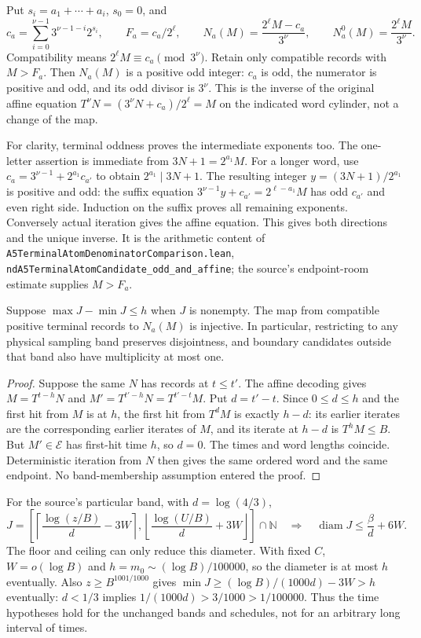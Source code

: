 Put $s_i=a_1+\cdots+a_i$, $s_0=0$, and
\[
 c_a=\sum_{i=0}^{\nu-1}3^{\nu-1-i}2^{s_i},\qquad
 F_a=c_a/2^\ell,\qquad
 N_a(M)=\frac{2^\ell M-c_a}{3^\nu},\qquad
 N_a^0(M)=\frac{2^\ell M}{3^\nu}.
\]
Compatibility means $2^\ell M\equiv c_a\pmod{3^\nu}$.
Retain only compatible records with $M>F_a$. Then $N_a(M)$ is a
positive odd integer: $c_a$ is odd, the numerator is positive and
odd, and its odd divisor is $3^\nu$.
This is the inverse of the original affine equation
$T^\nu N=(3^\nu N+c_a)/2^\ell=M$ on the indicated word cylinder,
not a change of the map.

For clarity, terminal oddness proves the intermediate exponents too.
The one-letter assertion is immediate from $3N+1=2^{a_1}M$.
For a longer word, use $c_a=3^{\nu-1}+2^{a_1}c_{a'}$ to obtain
$2^{a_1}\mid3N+1$. The resulting integer $y=(3N+1)/2^{a_1}$
is positive and odd: the suffix equation
$3^{\nu-1}y+c_{a'}=2^{\ell-a_1}M$ has odd $c_{a'}$ and even
right side. Induction on the suffix proves all remaining exponents.
Conversely actual iteration gives the affine equation.
This gives both directions and the unique inverse.
It is the arithmetic content of
\texttt{A5TerminalAtomDenominatorComparison.lean},
\texttt{ndA5TerminalAtomCandidate\_odd\_and\_affine};
the source's endpoint-room estimate supplies $M>F_a$.

\begin{proposition}
\label{prop:Mazur-atoms}
Suppose $\max J-\min J\le h$ when $J$ is nonempty.
The map from compatible positive terminal records to $N_a(M)$ is
injective. In particular, restricting to any physical sampling band
preserves disjointness, and boundary candidates outside that band
also have multiplicity at most one.
\end{proposition}
\begin{proof}
Suppose the same $N$ has records at $t\le t'$.
The affine decoding gives $M=T^{t-h}N$ and
$M'=T^{t'-h}N=T^{t'-t}M$. Put $d=t'-t$.
Since $0\le d\le h$ and the first hit from $M$ is at $h$,
the first hit from $T^dM$ is exactly $h-d$:
its earlier iterates are the corresponding earlier iterates of $M$,
and its iterate at $h-d$ is $T^hM\le B$.
But $M'\in\mathcal E$ has first-hit time $h$, so $d=0$.
The times and word lengths coincide. Deterministic iteration from $N$
then gives the same ordered word and the same endpoint.
No band-membership assumption entered the proof.
\end{proof}

For the source's particular band, with $d=\log(4/3)$,
\[
 J=\left[\left\lceil\frac{\log(z/B)}d-3W\right\rceil,
          \left\lfloor\frac{\log(U/B)}d+3W\right\rfloor\right]
          \cap\mathbb N
 \quad\Longrightarrow\quad
 \operatorname{diam}J\le\frac{\beta}{d}+6W .
\]
The floor and ceiling can only reduce this diameter.
With fixed $C$, $W=o(\log B)$ and
$h=m_0\sim(\log B)/100000$, so the diameter is at most $h$
eventually. Also $z\ge B^{1001/1000}$ gives
$\min J\ge (\log B)/(1000d)-3W>h$ eventually:
$d<1/3$ implies $1/(1000d)>3/1000>1/100000$.
Thus the time hypotheses hold for the unchanged bands and schedules,
not for an arbitrary long interval of times.

